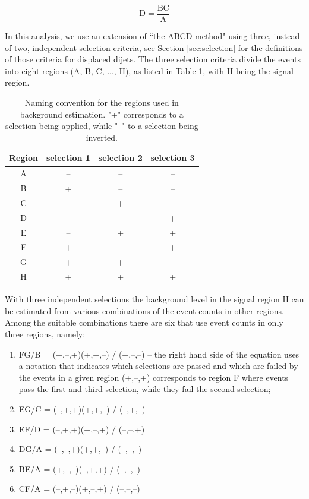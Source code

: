 \begin{equation}
\text{D} = \frac {\text{BC}}{\text{A}}
\end{equation}


In this analysis, we use an extension of ``the ABCD method" using
 three, instead of two, independent selection criteria, see Section \ref{sec:selection} for the definitions of those criteria for displaced dijets. 
The three selection criteria divide the events into eight
regions (A, B, C, ..., H), as listed in Table \ref{tab:regions}, with  H being the signal region.

\begin{table}[htbp]
\centering
\caption{Naming convention for the regions used in background estimation. "+" corresponds to a selection 
being applied, while "--" to a selection being inverted. \label{tab:regions}}
\vspace{0.1cm}
\begin{tabular}{cccc}
 \hline
  Region & selection 1 & selection 2 & selection 3 \\
 \hline
 A & -- & -- & -- \\
 B & + & -- & -- \\
 C & -- & + & -- \\
 D & -- & -- & + \\
 E & -- & + & + \\
 F & + & -- & + \\
 G & + & + & -- \\
 H & + & + & + \\
\hline
\end{tabular} 
\end{table}

With three independent selections the background level in the signal region H can be estimated from various combinations
of the event counts in other regions. Among the suitable combinations 
there are six that use event counts in only
three regions, namely:
\begin{enumerate}
 \item FG/B = (+,--,+)(+,+,--) / (+,--,--) -- the right hand side of the equation uses
 a notation that indicates which selections are passed and which are failed by 
 the events in a given region
 \ie (+,--,+) corresponds to region F where events pass the first and third selection,
 while they fail the second selection;
 \item EG/C = (--,+,+)(+,+,--) / (--,+,--)
 \item EF/D = (--,+,+)(+,--,+) / (--,--,+)
 \item DG/A = (--,--,+)(+,+,--) / (--,--,--)
 \item BE/A = (+,--,--)(--,+,+) / (--,--,--)
 \item CF/A = (--,+,--)(+,--,+) / (--,--,--)
\end{enumerate}



